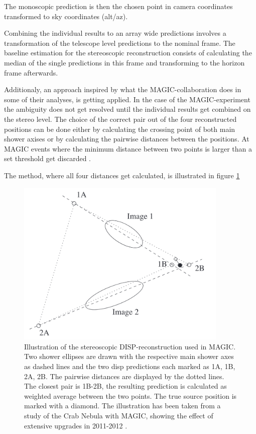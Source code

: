 The monoscopic prediction is then the chosen point in camera coordinates transformed
to sky coordinates (alt/az).

Combining the individual results to an array wide predictions
involves a transformation of the telescope level predictions to
the nominal frame.
The baseline estimation for the stereoscopic reconstruction consists of
calculating the median of the single predictions in this frame and
transforming to the horizon frame afterwards.

Additionaly, an approach inspired by 
what the MAGIC-collaboration does in some of their analyses,
is getting applied.
In the case of the MAGIC-experiment the ambiguity does not
get resolved until the individual results get combined
on the stereo level. The choice of the correct
pair out of the four reconstructed positions can be done either
by calculating the crossing point of both main shower axises
or by calculating the pairwise distances between the positions.
At MAGIC events where the minimum distance between two points is larger than a set threshold
get discarded \cite{ALEKSIC201676}.

The method, where all four distances get calculated, is illustrated in figure \ref{fig:disp_magic}

\begin{figure}
    \centering
    \captionsetup{width=0.9\linewidth}
    \includegraphics[width=0.9\textwidth]{images/magic_stereo_disp.png}
    \caption{Illustration of the stereoscopic DISP-reconstruction used in MAGIC.
        Two shower ellipses are drawn with the respective main shower axes as dashed lines
        and the two disp predictions each marked as 1A, 1B, 2A, 2B.
        The pairwise distances are displayed by the dotted lines.
        The closest pair is 1B-2B, the resulting prediction is calculated as 
        weighted average between the two points. The true source position is marked with a diamond.
        The illustration has been taken from a study of the Crab Nebula with MAGIC,
        showing the effect of extensive upgrades in 2011-2012 \cite{ALEKSIC201676}.}
    \label{fig:disp_magic}
\end{figure}


